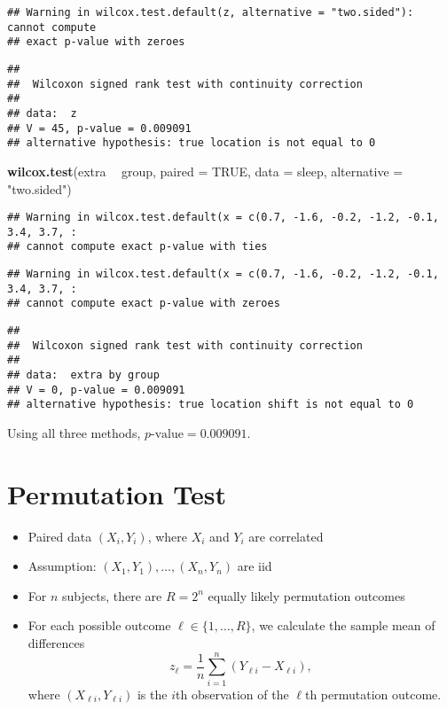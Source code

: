 \documentclass[
]{book}
\newenvironment{Shaded}{\begin{snugshade}}{\end{snugshade}}
\newcommand{\DataTypeTok}[1]{\textcolor[rgb]{0.13,0.29,0.53}{#1}}
\newcommand{\KeywordTok}[1]{\textcolor[rgb]{0.13,0.29,0.53}{\textbf{#1}}}
\newcommand{\NormalTok}[1]{#1}
\newcommand{\OperatorTok}[1]{\textcolor[rgb]{0.81,0.36,0.00}{\textbf{#1}}}
\newcommand{\OtherTok}[1]{\textcolor[rgb]{0.56,0.35,0.01}{#1}}
\newcommand{\StringTok}[1]{\textcolor[rgb]{0.31,0.60,0.02}{#1}}
\providecommand{\tightlist}{%
  \setlength{\itemsep}{0pt}\setlength{\parskip}{0pt}}
\begin{document}
\begin{verbatim}
## Warning in wilcox.test.default(z, alternative = "two.sided"): cannot compute
## exact p-value with zeroes
\end{verbatim}

\begin{verbatim}
## 
##  Wilcoxon signed rank test with continuity correction
## 
## data:  z
## V = 45, p-value = 0.009091
## alternative hypothesis: true location is not equal to 0
\end{verbatim}

\begin{Shaded}
\begin{Highlighting}[]
\KeywordTok{wilcox.test}\NormalTok{(extra }\OperatorTok{~}\StringTok{ }\NormalTok{group, }\DataTypeTok{paired =} \OtherTok{TRUE}\NormalTok{, }\DataTypeTok{data =}\NormalTok{ sleep, }\DataTypeTok{alternative =} \StringTok{"two.sided"}\NormalTok{)}
\end{Highlighting}
\end{Shaded}

\begin{verbatim}
## Warning in wilcox.test.default(x = c(0.7, -1.6, -0.2, -1.2, -0.1, 3.4, 3.7, :
## cannot compute exact p-value with ties
\end{verbatim}

\begin{verbatim}
## Warning in wilcox.test.default(x = c(0.7, -1.6, -0.2, -1.2, -0.1, 3.4, 3.7, :
## cannot compute exact p-value with zeroes
\end{verbatim}

\begin{verbatim}
## 
##  Wilcoxon signed rank test with continuity correction
## 
## data:  extra by group
## V = 0, p-value = 0.009091
## alternative hypothesis: true location shift is not equal to 0
\end{verbatim}

Using all three methods, \(p\text{-value} = 0.009091\).

\hypertarget{permutation-test}{%
\section{Permutation Test}\label{permutation-test}}

\begin{itemize}
\tightlist
\item
  Paired data \((X_i, Y_i)\), where \(X_i\) and \(Y_i\) are correlated
\item
  Assumption: \((X_1, Y_1), \dots, (X_n, Y_n)\) are iid
\item
  For \(n\) subjects, there are \(R = 2^n\) equally likely permutation outcomes
\item
  For each possible outcome \(\ell \in \{1, \dots, R\}\), we calculate the sample mean of differences
  \[z_\ell = \frac{1}{n} \sum_{i=1}^n (Y_{\ell i} - X_{\ell i}),\]
  where \((X_{\ell i}, Y_{\ell i})\) is the \(i\)th observation of the \(\ell\)th permutation outcome.
\end{itemize}
\end{document}
